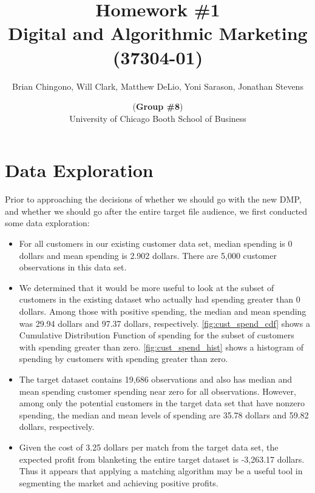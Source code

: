 



\title{Homework \#1\\
Digital and Algorithmic Marketing (37304-01)}
\author{
Brian Chingono, Will Clark, Matthew DeLio, Yoni Sarason, Jonathan Stevens \and (\textbf{Group \#8})\\
University of Chicago Booth School of Business}

\maketitle

\section{Data Exploration}

Prior to approaching the decisions of whether we should go with the new DMP, and whether we should go after the entire target file audience, we first conducted some data exploration:  
\begin{itemize}

\item For all customers in our existing customer data set, median spending is 0 dollars and mean spending is 2.902 dollars. There are 5,000 customer observations in this data set.

\item We determined that it would be more useful to look at the subset of customers in the existing dataset who actually had spending greater than 0 dollars.  Among those with positive spending, the median and mean spending was 29.94 dollars and 97.37 dollars, respectively.  \vref{fig:cust_spend_cdf} shows a Cumulative Distribution Function of spending for the subset of customers with spending greater than zero. \vref{fig:cust_spend_hist} shows a histogram of spending by customers with spending greater than zero.  

\item The target dataset contains 19,686 observations and also has median and mean spending customer spending near zero for all observations.  However, among only the potential customers in the target data set that have nonzero spending, the median and mean levels of spending are 35.78 dollars and 59.82 dollars, respectively. 

\item Given the cost of 3.25 dollars per match from the target data set, the expected profit from blanketing the entire target dataset is -3,263.17 dollars.  Thus it appears that applying a matching algorithm may be a useful tool in segmenting the market and achieving positive profits.  

\end{itemize}

